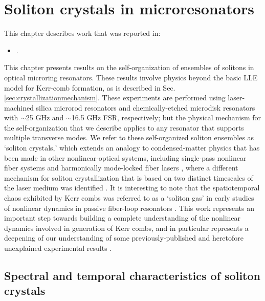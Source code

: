  \chapter{Soliton crystals in microresonators} \label{chap:SolitonCrystals}
 
  \begin{footnotesize}
 	\begin{spacing}{1.2}
 		This chapter describes work that was reported in:
 		\begin{itemize}
 			\item {}.\\
 		\end{itemize}
 	\end{spacing}
 \end{footnotesize}

This chapter presents results on the self-organization of ensembles of solitons in optical microring resonators. These results involve physics beyond the basic LLE model for Kerr-comb formation, as is described in Sec. \ref{sec:crystallizationmechanism}. These experiments are performed using laser-machined silica microrod resonators \cite{DelHaye2013} and chemically-etched microdisk \cite{Lee2012} resonators with $\sim$25 GHz and $\sim$16.5 GHz FSR, respectively; but the physical mechanism for the self-organization that we describe applies to any resonator that supports multiple transverse modes. We refer to these self-organized soliton ensembles as `soliton crystals,' which extends an analogy to condensed-matter physics that has been made in other nonlinear-optical systems, including single-pass nonlinear fiber systems \cite{Zajnulina2017} and harmonically mode-locked fiber lasers \cite{Haboucha2008,Amrani2011a}, where a different mechanism for soliton crystallization that is based on two distinct timescales of the laser medium was identified \cite{Haboucha2008c}. It is interesting to note that the spatiotemporal chaos exhibited by Kerr combs was referred to as a `soliton gas' in early studies of nonlinear dynamics in passive fiber-loop resonators \cite{Malomed1998,Mitschke1998,Schwache1997}. This work represents an important step towards building a complete understanding of the nonlinear dynamics involved in generation of Kerr combs, and in particular represents a deepening of our understanding of some previously-published and heretofore unexplained experimental results \cite{DelHaye2014,DelHaye2015a}.

\section{Spectral and temporal characteristics of soliton crystals}

